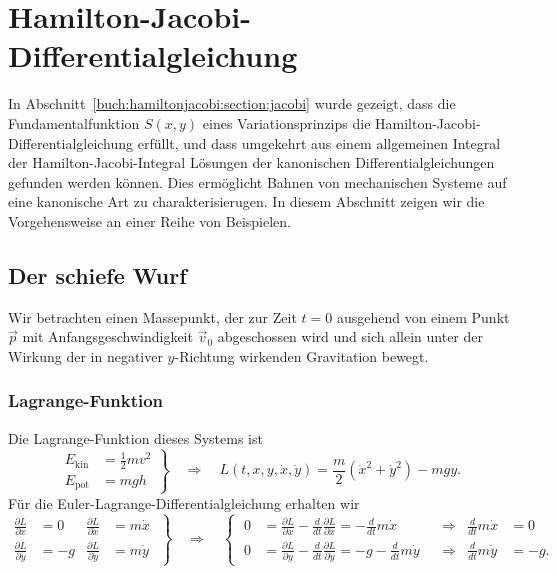 %
%
%
\section{Hamilton-Jacobi-Differentialgleichung
\label{buch:mechanik:section:jacobi}}
In Abschnitt~\ref{buch:hamiltonjacobi:section:jacobi} wurde gezeigt,
dass die Fundamentalfunktion $S(x,y)$ eines Variationsprinzips 
die Hamilton-Jacobi-Differentialgleichung erfüllt, und dass umgekehrt
aus einem allgemeinen Integral der Hamilton-Jacobi-Integral Lösungen
der kanonischen Differentialgleichungen gefunden werden können.
Dies ermöglicht Bahnen von mechanischen Systeme auf eine kanonische
Art zu charakterisierugen.
In diesem Abschnitt zeigen wir die Vorgehensweise an einer Reihe
von Beispielen.

%
%
\subsection{Der schiefe Wurf
\label{buch:mechanik:jacobi:schieferwurf}}
Wir betrachten einen Massepunkt, der zur Zeit $t=0$ ausgehend von einem
Punkt $\vec{p}$ mit Anfangsgeschwindigkeit $\vec{v}_0$ abgeschossen
wird und sich allein unter der Wirkung der in negativer $y$-Richtung
wirkenden Gravitation bewegt.

%
%
\subsubsection{Lagrange-Funktion}
Die Lagrange-Funktion dieses Systems ist
\[
\left.
\begin{aligned}
E_{\text{kin}}
&=
\frac12 mv^2
\\
E_{\text{pot}}
&=
mgh
\end{aligned}
\right\}
\quad\Rightarrow\quad
L(t,x,y,\dot{x},\dot{y})
=
\frac{m}2 (\dot{x}^2 + \dot{y}^2)
-
mgy.
\]
Für die Euler-Lagrange-Differentialgleichung erhalten wir
\begin{equation}
\left.
\begin{aligned}
\frac{\partial L}{\partial x}
&=
0
&
\frac{\partial L}{\partial \dot{x}}
&=
m\dot{x}
\\
\frac{\partial L}{\partial y}
&=
-g
&
\frac{\partial L}{\partial \dot{y}}
&=
m\dot{y}
\end{aligned}
\;\right\}
\quad\Rightarrow\quad
\left\{\;
\begin{aligned}
0
&=
\frac{\partial L}{\partial x}-\frac{d}{dt}\frac{\partial L}{\partial\dot{x}}
=
-\frac{d}{dt}m\dot{x}
&&\Rightarrow&\frac{d}{dt}m\dot{x}&=0
\\
0
&=
\frac{\partial L}{\partial y}-\frac{d}{dt}\frac{\partial L}{\partial\dot{y}}
=
-g
-\frac{d}{dt}m\dot{y}
&&\Rightarrow&\frac{d}{dt}m\dot{y}&=-g.
\end{aligned}
\right.
\label{buch:mechanik:jacobi:wurf:eqn:bewegungsgleichung}
\end{equation}

